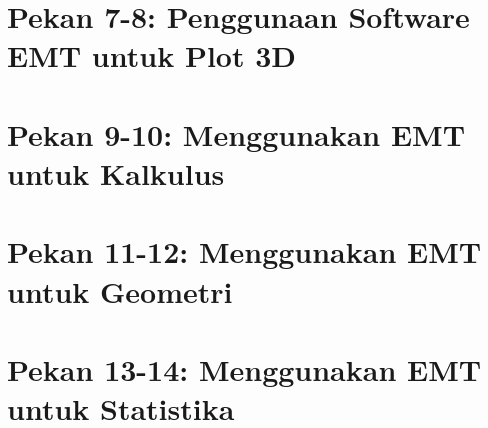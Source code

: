 \documentclass{report}
\begin{document}
\chapter{Pekan 7-8: Penggunaan Software EMT untuk Plot 3D}

\newpage
\chapter{Pekan 9-10: Menggunakan EMT untuk Kalkulus}

\newpage
\chapter{Pekan 11-12: Menggunakan EMT untuk Geometri}

\newpage
\chapter{Pekan 13-14: Menggunakan EMT untuk Statistika}

\end{document}
